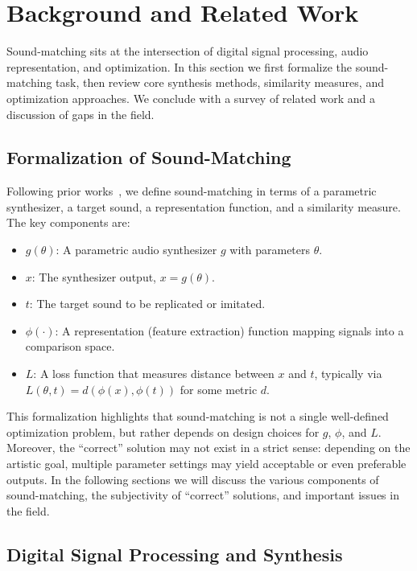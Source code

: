 \section{Background and Related Work}
\label{sec:background_related}

Sound-matching sits at the intersection of digital signal processing, audio representation, and optimization. 
In this section we first formalize the sound-matching task, then review core synthesis methods, similarity measures, and optimization approaches. 
We conclude with a survey of related work and a discussion of gaps in the field. 

\subsection{Formalization of Sound-Matching}
\label{sec:sound_matching_definition}
Following prior works~\cite{vahidi2023mesostructures,han2023perceptual}, we define sound-matching in terms of a parametric synthesizer, a target sound, a representation function, and a similarity measure. 
The key components are:
\begin{itemize}
    \item $g(\theta)$: A parametric audio synthesizer $g$ with parameters $\theta$.
    \item $x$: The synthesizer output, $x = g(\theta)$.
    \item $t$: The target sound to be replicated or imitated. 
    \item $\phi(\cdot)$: A representation (feature extraction) function mapping signals into a comparison space.
    \item $L$: A loss function that measures distance between $x$ and $t$, typically via $L(\theta,t) = d(\phi(x), \phi(t))$ for some metric $d$.
\end{itemize}

This formalization highlights that sound-matching is not a single well-defined optimization problem, but rather depends on design choices for $g$, $\phi$, and $L$. 
Moreover, the ``correct'' solution may not exist in a strict sense: depending on the artistic goal, multiple parameter settings may yield acceptable or even preferable outputs.  In the following sections we will discuss the various components of sound-matching, the subjectivity of ``correct'' solutions, and important issues in the field. 


\subsection{Digital Signal Processing and Synthesis}
\label{sec:dsp}

